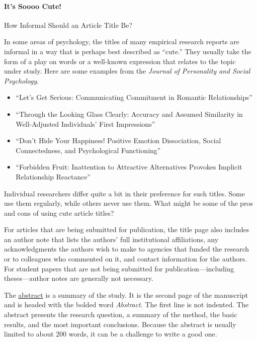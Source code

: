 \documentclass[
]{krantz}
\providecommand{\tightlist}{%
  \setlength{\itemsep}{0pt}\setlength{\parskip}{0pt}}
\begin{document}
\hypertarget{its-soooo-cute}{%
\paragraph*{It's Soooo Cute!}\label{its-soooo-cute}}

How Informal Should an Article Title Be?

In some areas of psychology, the titles of many empirical research reports are informal in a way that is perhaps best described as ``cute.'' They usually take the form of a play on words or a well-known expression that relates to the topic under study. Here are some examples from the \emph{Journal of Personality and Social Psychology}.

\begin{itemize}
\tightlist
\item
  ``Let's Get Serious: Communicating Commitment in Romantic Relationships''
\item
  ``Through the Looking Glass Clearly: Accuracy and Assumed Similarity in Well-Adjusted Individuals' First Impressions''
\item
  ``Don't Hide Your Happiness! Positive Emotion Dissociation, Social Connectedness, and Psychological Functioning''
\item
  ``Forbidden Fruit: Inattention to Attractive Alternatives Provokes Implicit Relationship Reactance''
\end{itemize}

Individual researchers differ quite a bit in their preference for such titles. Some use them regularly, while others never use them. What might be some of the pros and cons of using cute article titles?

For articles that are being submitted for publication, the title page also includes an author note that lists the authors' full institutional affiliations, any acknowledgments the authors wish to make to agencies that funded the research or to colleagues who commented on it, and contact information for the authors. For student papers that are not being submitted for publication---including theses---author notes are generally not necessary.

The \protect\hyperlink{abstract}{abstract} is a summary of the study. It is the second page of the manuscript and is headed with the bolded word \emph{Abstract.} The first line is not indented. The abstract presents the research question, a summary of the method, the basic results, and the most important conclusions. Because the abstract is usually limited to about 200 words, it can be a challenge to write a good one.
\end{document}
